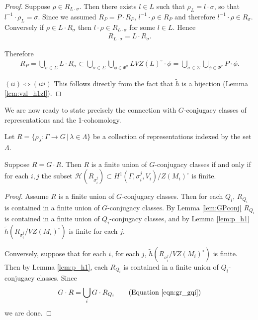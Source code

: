 \begin{proof}
  Suppose $\rho \in R_{L \cdot \sigma}$. Then there exists $l \in L$ such that $\rho_L = l \cdot \sigma$, so that $l^{-1} \cdot \rho_L = \sigma$. Since we assumed $R_P = P \cdot R_P$, $l^{-1} \cdot \rho \in R_P$ and therefore $l^{-1} \cdot \rho \in R_\sigma$. Conversely if $\rho \in L \cdot R_\sigma$ then $l \cdot \rho \in R_{L \cdot \sigma}$ for some $l \in L$. Hence
  \begin{eqnarray*}
    R_{L \cdot \sigma} = L \cdot R_\sigma.
  \end{eqnarray*}

  Therefore
  \begin{eqnarray*}
    R_P = \bigcup_{\sigma \in \Sigma} L \cdot R_\sigma \subset \bigcup_{\sigma \in \Sigma}\bigcup_{\phi \in \Phi^\sigma} LVZ(L)^\circ \cdot \phi = \bigcup_{\sigma \in \Sigma}\bigcup_{\phi \in \Phi^\sigma} P \cdot \phi.
  \end{eqnarray*}

  $(ii) \Leftrightarrow (iii)$ This follows directly from the fact that $\tilde{h}$ is a bijection (Lemma \ref{lem:vzl_h1zl}).

\end{proof}

We are now ready to state precisely the connection with $G$-conjugacy classes of representations and the 1-cohomology.

\begin{theorem}
  Let $R=\{\rho_\lambda:\Gamma\rightarrow G\,|\,\lambda \in \Lambda\}$ be a collection of representations indexed by the set $\Lambda$. 
  
  Suppose $R = G \cdot R$. Then $R$ is a finite union of $G$-conjugacy classes if and only if for each $i, j$ the subset $\mathcal{H}(R_{\sigma_i^j}) \subset H^1(\Gamma, \sigma_i^j, V_i) / Z(M_i)^\circ$ is finite.
  \label{thm:g_h1}
\end{theorem}
\begin{proof}
  Assume $R$ is a finite union of $G$-conjugacy classes. Then for each $Q_i$, $R_{Q_i}$ is contained in a finite union of $G$-conjugacy classes. By Lemma \ref{lem:GPconj} $R_{Q_i}$ is contained in a finite union of $Q_i$-conjugacy classes, and by Lemma \ref{lem:p_h1} $\tilde{h}(R_{\sigma_i^j}/VZ(M_i)^\circ)$ is finite for each $j$.

  Conversely, suppose that for each $i$, for each $j$, $\tilde{h}(R_{\sigma_i^j}/VZ(M_i)^\circ)$ is finite. Then by Lemma \ref{lem:p_h1}, each $R_{Q_i}$ is contained in a finite union of $Q_i$-conjugacy classes. Since
  \begin{eqnarray*}
    G \cdot R = \bigcup_i G \cdot R_{Q_i} \qquad (\textrm{Equation }\ref{eqn:gr_gqi})
  \end{eqnarray*}
  we are done.
\end{proof}

